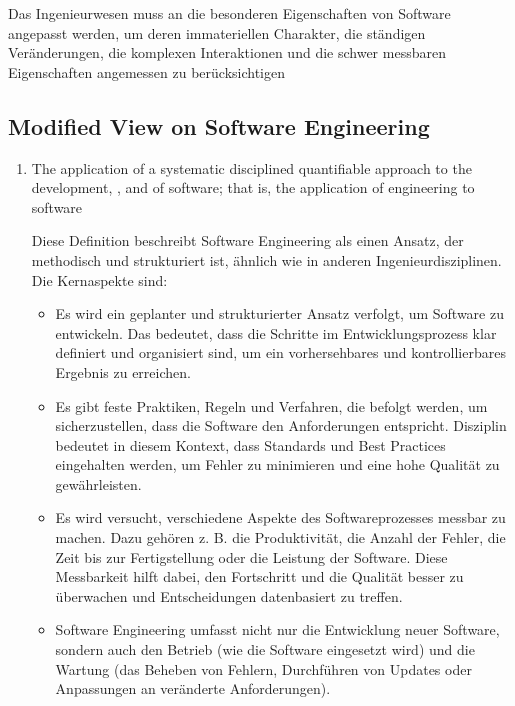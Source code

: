\begin{infoBox}
    Das Ingenieurwesen muss an die besonderen Eigenschaften von Software angepasst werden, um deren immateriellen Charakter, die ständigen Veränderungen, die komplexen Interaktionen und die schwer messbaren Eigenschaften angemessen zu berücksichtigen
\end{infoBox}
\subsection{Modified View on Software Engineering}
\begin{defBox}[title=Software Engineering (IEEE Standards Board\, Glossary of SE TErminology)]
    \begin{enumerate}
        \item The application of a systematic disciplined quantifiable approach to the development, , and  of software; that is, the application of engineering to software
        \begin{infoBox}
            Diese Definition beschreibt Software Engineering als einen Ansatz, der methodisch und strukturiert ist, ähnlich wie in anderen Ingenieurdisziplinen. Die Kernaspekte sind:
            \begin{itemize}
                \item {} Es wird ein geplanter und strukturierter Ansatz verfolgt, um Software zu entwickeln. Das bedeutet, dass die Schritte im Entwicklungsprozess klar definiert und organisiert sind, um ein vorhersehbares und kontrollierbares Ergebnis zu erreichen.
                \item {} Es gibt feste Praktiken, Regeln und Verfahren, die befolgt werden, um sicherzustellen, dass die Software den Anforderungen entspricht. Disziplin bedeutet in diesem Kontext, dass Standards und Best Practices eingehalten werden, um Fehler zu minimieren und eine hohe Qualität zu gewährleisten.
                \item {} Es wird versucht, verschiedene Aspekte des Softwareprozesses messbar zu machen. Dazu gehören z. B. die Produktivität, die Anzahl der Fehler, die Zeit bis zur Fertigstellung oder die Leistung der Software. Diese Messbarkeit hilft dabei, den Fortschritt und die Qualität besser zu überwachen und Entscheidungen datenbasiert zu treffen.
                \item {} Software Engineering umfasst nicht nur die Entwicklung neuer Software, sondern auch den Betrieb (wie die Software eingesetzt wird) und die Wartung (das Beheben von Fehlern, Durchführen von Updates oder Anpassungen an veränderte Anforderungen).

\end{itemize}
\end{infoBox}
\end{enumerate}
\end{defBox}
